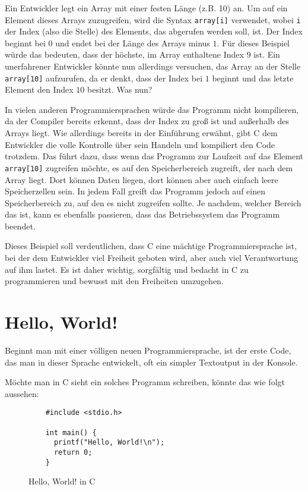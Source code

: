 \documentclass[11pt]{article}
\begin{document}
\begin{bsp}
  Ein Entwickler legt ein Array mit einer festen Länge (z.B. 10) an. Um auf ein Element dieses Arrays zuzugreifen,
  wird die Syntax \texttt{array[i]} verwendet, wobei \texttt{i} der Index (also die Stelle) des Elements, das abgerufen
  werden soll, ist. Der Index beginnt bei $0$ und endet bei der Länge des Arrays minus $1$. Für dieses Beispiel würde das
  bedeuten, dass der höchste, im Array enthaltene Index $9$ ist. Ein unerfahrener Entwickler könnte nun allerdings versuchen,
  das Array an der Stelle \texttt{array[10]} aufzurufen, da er denkt, dass der Index bei $1$ beginnt und das letzte
  Element den Index $10$ besitzt. Was nun?

  In vielen anderen Programmiersprachen würde das Programm nicht kompilieren, da der Compiler bereits erkennt, dass der
  Index zu groß ist und außerhalb des Arrays liegt. Wie allerdings bereits in der Einführung erwähnt, gibt C dem Entwickler
  die volle Kontrolle über sein Handeln und kompiliert den Code trotzdem. Das führt dazu, dass wenn das Programm zur Laufzeit
  auf das Element \texttt{array[10]} zugreifen möchte, es auf den Speicherbereich zugreift, der nach dem Array liegt. Dort
  können Daten liegen, dort können aber auch einfach leere Speicherzellen sein. In jedem Fall greift das Programm jedoch
  auf einen Speicherbereich zu, auf den es nicht zugreifen sollte. Je nachdem, welcher Bereich das ist, kann es ebenfalls
  passieren, dass das Betriebssystem das Programm beendet.
\end{bsp}

Dieses Beispiel soll verdeutlichen, dass C eine mächtige Programmiersprache ist, bei der dem Entwickler viel Freiheit geboten
wird, aber auch viel Verantwortung auf ihm lastet. Es ist daher wichtig, sorgfältig und bedacht in C zu programmieren und
bewusst mit den Freiheiten umzugehen.

\newpage

\section{Hello, World!}
Beginnt man mit einer völligen neuen Programmiersprache, ist der erste Code, das man in dieser Sprache entwickelt,
oft ein simpler Textoutput in der Konsole.

Möchte man in C sieht ein solches Programm schreiben, könnte das wie folgt aussehen:
\begin{figure}[h!]
  \ignorespaces
  \begin{verbatim}
    #include <stdio.h>

    int main() {
      printf("Hello, World!\n");
      return 0;
    }
  \end{verbatim}
  \caption{Hello, World! in C}
  \label{fig:hello-world}
\end{figure}
\end{document}
